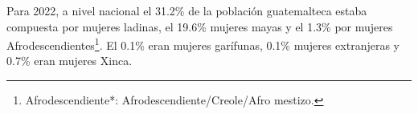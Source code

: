 Para 2022, a nivel nacional el 31.2\% de la población guatemalteca estaba compuesta por mujeres ladinas, el 19.6\% mujeres mayas y el 1.3\% por mujeres Afrodescendientes\footnote{Afrodescendiente*: Afrodescendiente/Creole/Afro mestizo.}. El 0.1\% eran mujeres garífunas, 0.1\% mujeres extranjeras y 0.7\% eran mujeres Xinca.